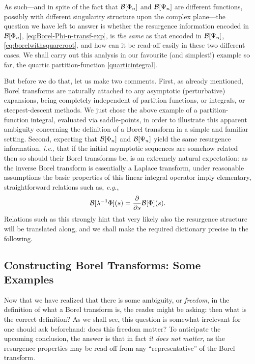 \documentclass[11pt,a4paper]{article}
\newcommand{\CB}{{\cal B}}
\newcommand{\be}{\begin{equation}}
\newcommand{\ee}{\end{equation}}
\begin{document}
As such---and in spite of the fact that $\CB[\Phi_{n}]$ and $\CB[\Psi_{n}]$ are different functions, possibly with different singularity structure upon the complex plane---the question we have left to answer is whether the resurgence information encoded in $\CB[\Phi_{n}]$, \eqref{eq:Borel-Phi-n-transf-exp}, is \textit{the same} as that encoded in $\CB[\Psi_{n}]$, \eqref{eq:borelwithsquareroot}, and how can it be read-off easily in these two different cases. We shall carry out this analysis in our favourite (and simplest!) example so far, the quartic partition-function \eqref{quarticintegral}.

But before we do that, let us make two comments. First, as already mentioned, Borel transforms are naturally attached to any asymptotic (perturbative) expansions, being completely independent of partition functions, or integrals, or steepest-descent methods. We just chose the above example of a partition-function integral, evaluated via saddle-points, in order to illustrate this apparent ambiguity concerning the definition of a Borel transform in a simple and familiar setting. Second, expecting that $\CB[\Phi_{n}]$ and $\CB[\Psi_{n}]$ yield the same resurgence information, \textit{i.e.}, that if the initial asymptotic sequences are somehow related then so should their Borel transforms be, is an extremely natural expectation: as the inverse Borel transform is essentially a Laplace transform, under reasonable assumptions the basic properties of this linear integral operator imply elementary, straightforward relations such as, \textit{e.g.},
%
\be
\CB [ \lambda^{-1} \Phi ] (s) = \frac{\partial}{\partial s} \CB [\Phi] (s).
\ee
%
\noindent
Relations such as this strongly hint that very likely also the resurgence structure will be translated along, and we shall make the required dictionary precise in the following.

\subsection*{Constructing Borel Transforms: Some Examples}

Now that we have realized that there is some ambiguity, or \textit{freedom}, in the definition of what a Borel transform is, the reader might be asking: then what is the correct definition? As we shall see, this question is somewhat irrelevant for one should ask beforehand: does this freedom matter? To anticipate the upcoming conclusion, the answer is that in fact \textit{it does not matter}, as the resurgence properties may be read-off from any ``representative'' of the Borel transform.
\end{document}
